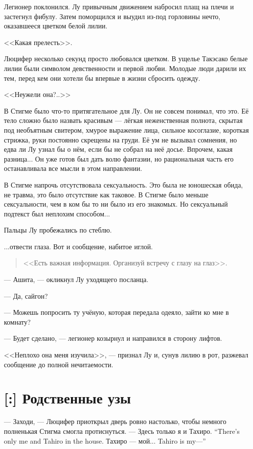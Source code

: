 Легионер поклонился.
Лу привычным движением набросил плащ на плечи и застегнул фибулу.
Затем поморщился и выудил из-под горловины нечто, оказавшееся цветком белой лилии.

<<Какая прелесть>>.

Люцифер несколько секунд просто любовался цветком.
В ущелье Такэсако белые лилии были символом девственности и первой любви.
Молодые люди дарили их тем, перед кем они хотели бы впервые в жизни сбросить одежду.

<<Неужели она?..>>

В Стигме было что-то притягательное для Лу.
Он не совсем понимал, что это.
Её тело сложно было назвать красивым --- лёгкая неженственная полнота, скрытая под необъятным свитером, хмурое выражение лица, сильное косоглазие, короткая стрижка, руки постоянно скрещены на груди.
Её ум не вызывал сомнения, но едва ли Лу узнал бы о нём, если бы не собрал на неё досье.
Впрочем, какая разница...
Он уже готов был дать волю фантазии, но рациональная часть его останавливала все мысли в этом направлении.

В Стигме напрочь отсутствовала сексуальность.
Это была не юношеская обида, не травма, это было отсутствие как таковое.
В Стигме было меньше сексуальности, чем в ком бы то ни было из его знакомых.
Но сексуальный подтекст был неплохим способом...

Пальцы Лу пробежались по стеблю.

...отвести глаза.
Вот и сообщение, набитое иглой.

\begin{quote}
<<Есть важная информация.
Организуй встречу с глазу на глаз>>.
\end{quote}

--- Ашита, --- окликнул Лу уходящего посланца.

--- Да, сайгон?

--- Можешь попросить ту учёную, которая передала одеяло, зайти ко мне в комнату?

--- Будет сделано, --- легионер козырнул и направился в сторону лифтов.

<<Неплохо она меня изучила>>, --- признал Лу и, сунув лилию в рот, разжевал сообщение до полной нечитаемости.

\section{[:] Родственные узы}

--- Заходи, --- Люцифер приоткрыл дверь ровно настолько, чтобы немного полненькая Стигма смогла протиснуться.
{--- Здесь только я и Тахиро.}
{``There's only me and Tahiro in the house.}
{Тахиро --- мой...}
{Tahiro is my---''}

